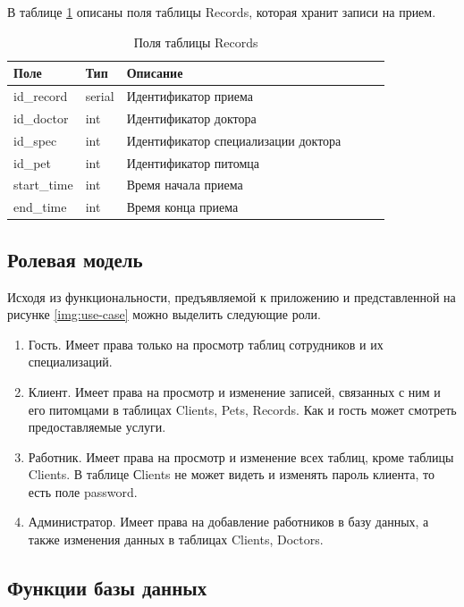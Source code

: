 В таблице \ref{tab:records}  описаны поля таблицы Records, которая хранит записи на прием. 
\begin{table}[hbtp]
		\caption{\label{tab:records}Поля таблицы Records}
	\begin{center}
		\begin{tabular}{|l|l|l|l|l|l|}
			\hline {Поле} & {Тип} & {Описание}  \\ \hline
			id\_record  & serial & Идентификатор приема   \\ \hline
			id\_doctor & int & Идентификатор доктора  \\ \hline
			id\_spec & int & Идентификатор специализации доктора  \\ \hline
			id\_pet & int & Идентификатор питомца   \\ \hline
			start\_time & int & Время начала приема\\ \hline
			end\_time & int & Время конца приема\\ \hline
		\end{tabular}
	\end{center}
\end{table}

\pagebreak

\subsection{Ролевая модель}
Исходя из функциональности, предъявляемой к приложению и представленной на рисунке \ref{img:use-case} можно выделить следующие роли.
\begin{enumerate}[label=\arabic*)]
	\item Гость. Имеет права только на просмотр таблиц сотрудников и их специализаций.
	\item Клиент. Имеет права на просмотр и изменение записей, связанных с ним и его питомцами в таблицах Clients, Pets, Records. Как и гость может смотреть предоставляемые услуги.
	\item Работник. Имеет права на просмотр и изменение всех таблиц, кроме таблицы Clients. В таблице Сlients не может видеть и изменять пароль клиента, то есть поле password.  
	\item Администратор. Имеет права на добавление работников в базу данных, а также изменения данных в таблицах Clients, Doctors.
\end{enumerate}

\subsection{Функции базы данных}

